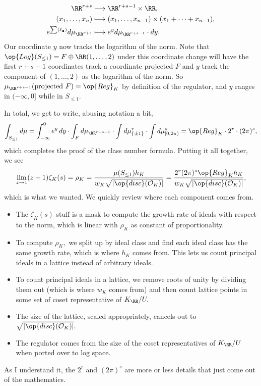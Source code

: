 \begin{align*}
    \RR^{r+s} &\longrightarrow \RR^{r+s-1}\times\RR, \\
    (x_1,\ldots,x_n) &\longmapsto (x_1,\ldots,x_{n-1})\times(x_1+\cdots+x_{n-1}), \\
    e^{\sum(\ell_\bullet)}d\mu_{\RR^{r+s}} &\longmapsto e^yd\mu_{\RR^{r+s-1}}\cdot dy.
\end{align*}
Our coordinate $y$ now tracks the logarithm of the norm. Note that $\op{Log}(S_{\le1})=F\oplus\RR(1,\ldots,2)$ under this coordinate change will have the first $r+s-1$ coordinates track a coordinate projected $F$ and $y$ track the component of $(1,\ldots,2)$ as the logarithm of the norm. So $\mu_{\RR^{r+s-1}}(\text{projected }F)=\op{Reg}_K$ by definition of the regulator, and $y$ ranges in $(-\infty,0]$ while in $S_{\le1}.$

In total, we get to write, abusing notation a bit,
\[\int_{S_{\le1}}d\mu=\int_{-\infty}^0e^y\,dy\cdot\int_Fd\mu_{\RR^{r+s-1}}\cdot\int d\mu_{\{\pm1\}}^r\cdot\int d\mu_{[0,2\pi)}^s=\op{Reg}_K\cdot2^r\cdot(2\pi)^s,\]
which completes the proof of the class number formula. Putting it all together, we see
\[\lim_{z\to1}(z-1)\zeta_K(s)=\rho_K=\frac{\mu(S_{\le1})h_K}{w_K\sqrt{|\op{disc}(\mathcal O_K)|}}=\frac{2^r(2\pi)^s\op{Reg}_Kh_K}{w_K\sqrt{|\op{disc}(\mathcal O_K)|}},\]
which is what we wanted. We quickly review where each component comes from.
\begin{itemize}
    \item The $\zeta_K(s)$ stuff is a mask to compute the growth rate of ideals with respect to the norm, which is linear with $\rho_K$ as constant of proportionality.
    \item To compute $\rho_K,$ we split up by ideal class and find each ideal class has the same growth rate, which is where $h_K$ comes from. This lets us count principal ideals in a lattice instead of arbitrary ideals.
    \item To count principal ideals in a lattice, we remove roots of unity by dividing them out (which is where $w_K$ comes from) and then count lattice points in some set of coset representative of $K_\RR/U.$
    \item The size of the lattice, scaled appropriately, cancels out to $\sqrt{|\op{disc}(\mathcal O_K)|}.$
    \item The regulator comes from the size of the coset representatives of $K_\RR/U$ when ported over to log space.
\end{itemize}
As I understand it, the $2^r$ and $(2\pi)^s$ are more or less details that just come out of the mathematics.

